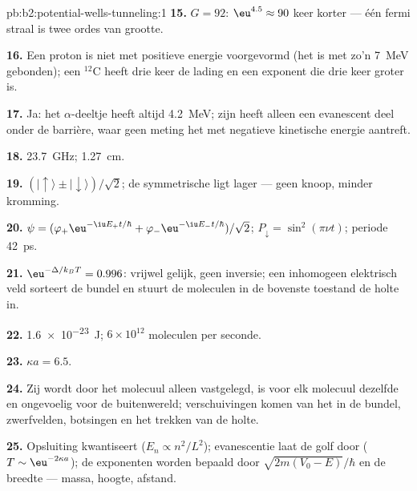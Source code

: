 \begin{solution}{pb:b2:potential-wells-tunneling:1}
\textbf{15.} $G = 92$: $\eu^{4.5} \approx 90$ keer korter --- één fermi straal
is twee ordes van grootte.

\textbf{16.} Een proton is niet met positieve energie voorgevormd (het is
met zo'n \qty{7}{MeV} gebonden); een $^{12}$C heeft drie keer de lading en een
exponent die drie keer groter is.

\textbf{17.} Ja: het $\alpha$-deeltje heeft altijd \qty{4.2}{MeV}; zijn 
heeft alleen een evanescent deel onder de barrière, waar geen meting
het met negatieve kinetische energie aantreft.

\textbf{18.} \qty{23.7}{GHz}; \qty{1.27}{cm}.

\textbf{19.} $(|{\uparrow}\rangle \pm |{\downarrow}\rangle)/\sqrt2$; de
symmetrische ligt lager --- geen knoop, minder kromming.

\textbf{20.}
$\psi = (\varphi_+\eu^{-\iu E_+t/\hbar} + \varphi_-\eu^{-\iu E_-t/\hbar})/\sqrt2$;
$P_{\downarrow} = \sin^2(\pi\nu t)$; periode \qty{42}{ps}.

\textbf{21.} $\eu^{-\Delta/k_BT} = 0.996$: vrijwel gelijk, geen inversie; een
inhomogeen elektrisch veld sorteert de bundel en stuurt de moleculen in de
bovenste toestand de holte in.

\textbf{22.} \qty{1.6e-23}{J}; $6 \times 10^{12}$ moleculen per seconde.

\textbf{23.} $\kappa a = 6.5$.

\textbf{24.} Zij wordt door het molecuul alleen vastgelegd, is voor elk
molecuul dezelfde en ongevoelig voor de buitenwereld; verschuivingen komen van het
 in de bundel, zwerfvelden, botsingen en
het trekken van de holte.

\textbf{25.} Opsluiting kwantiseert ($E_n \propto n^2/L^2$); evanescentie laat
de golf door ($T \sim \eu^{-2\kappa a}$); de exponenten worden bepaald door
$\sqrt{2m(V_0 - E)}/\hbar$ en de breedte --- massa, hoogte, afstand.
\end{solution}
